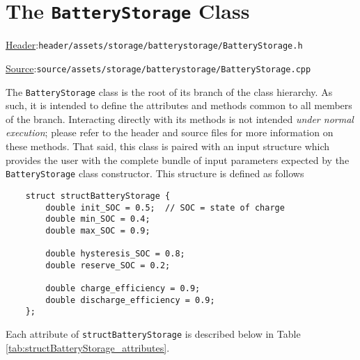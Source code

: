 \documentclass[12pt, letterpaper]{report}
\begin{document}
\section{The \texttt{BatteryStorage} Class}

\begin{large}
\noindent\underline{Header}:\quad\texttt{header/assets/storage/batterystorage/BatteryStorage.h}\par
\noindent\underline{Source}:\quad\texttt{source/assets/storage/batterystorage/BatteryStorage.cpp}\par
\end{large}
\vspace{5mm}

The \texttt{BatteryStorage} class is the root of its branch of the class hierarchy. As such, it is intended to define the attributes and methods common to all members of the branch. Interacting directly with its methods is not intended \textit{under normal execution}; please refer to the header and source files for more information on these methods. That said, this class is paired with an input structure which provides the user with the complete bundle of input parameters expected by the \texttt{BatteryStorage} class constructor. This structure is defined as follows

\begin{verbatim}
    struct structBatteryStorage {
        double init_SOC = 0.5;  // SOC = state of charge
        double min_SOC = 0.4;
        double max_SOC = 0.9;
        
        double hysteresis_SOC = 0.8;
        double reserve_SOC = 0.2;
        
        double charge_efficiency = 0.9;
        double discharge_efficiency = 0.9;
    };
\end{verbatim}

\noindent Each attribute of \texttt{structBatteryStorage} is described below in Table \ref{tab:structBatteryStorage_attributes}.
\end{document}
